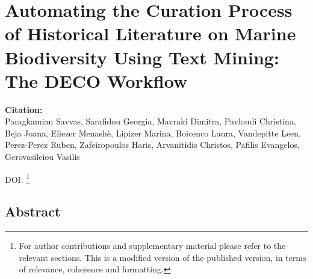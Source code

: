 % 
% 


\chapter{Automating the Curation Process of Historical Literature on Marine Biodiversity Using Text Mining: The DECO Workflow}
\label{cha:deco}


\textbf{Citation:} \\ 
Paragkamian Savvas, Sarafidou Georgia, Mavraki Dimitra, Pavloudi Christina,
Beja Joana, Eliezer Menashè, Lipizer Marina, Boicenco Laura, Vandepitte Leen,
Perez-Perez Ruben, Zafeiropoulos Haris, Arvanitidis Christos, Pafilis Evangelos, Gerovasileiou Vasilis

DOI: \href{https://www.frontiersin.org/articles/10.3389/fmars.2022.940844}\footnote{
   For author contributions and supplementary material please refer to the relevant sections. 
   This is a modified version of the published version,
   in terms of relevance, coherence and formatting.
   }


\section{Abstract}

